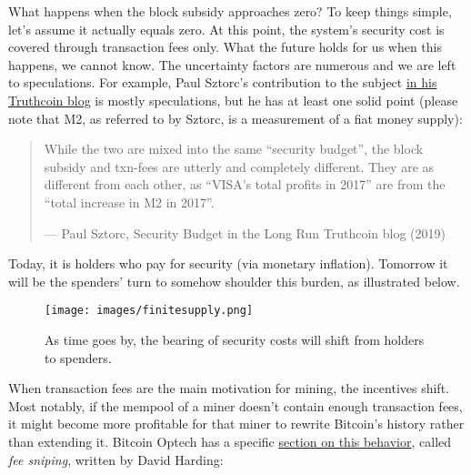 What happens when the block subsidy approaches zero? To keep things
simple, let's assume it actually equals zero. At this point, the
system's security cost is covered through transaction fees only. What
the future holds for us when this happens, we cannot know. The
uncertainty factors are numerous and we are left to speculations. For
example, Paul Sztorc's contribution to the subject
\href{https://www.truthcoin.info/blog/security-budget/}{in his Truthcoin
blog} is mostly speculations, but he has at least one solid point
(please note that M2, as referred to by Sztorc, is a measurement of a
fiat money supply):

\begin{quote}
While the two are mixed into the same ``security budget'', the block
subsidy and txn-fees are utterly and completely different. They are as
different from each other, as ``VISA's total profits in 2017'' are from
the ``total increase in M2 in 2017''.

---  Paul Sztorc, Security Budget in the Long Run Truthcoin blog (2019)
\end{quote}

Today, it is holders who pay for security (via monetary inflation).
Tomorrow it will be the spenders' turn to somehow shoulder this burden,
as illustrated below.

\begin{figure}
\centering
\texttt{[image: images/finitesupply.png]}
\caption{As time goes by, the bearing of security costs will shift from
holders to spenders.}
\end{figure}

When transaction fees are the main motivation for mining, the incentives
shift. Most notably, if the mempool of a miner doesn't contain enough
transaction fees, it might become more profitable for that miner to
rewrite Bitcoin's history rather than extending it. Bitcoin Optech has a
specific \href{https://bitcoinops.org/en/topics/fee-sniping/}{section on
this behavior}, called \emph{fee sniping}, written by David Harding:


